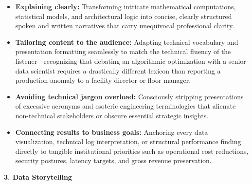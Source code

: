 \begin{itemize}
\tightlist
\item
  \textbf{Explaining clearly:} Transforming intricate mathematical
  computations, statistical models, and architectural logic into
  concise, clearly structured spoken and written narratives that carry
  unequivocal professional clarity.
\item
  \textbf{Tailoring content to the audience:} Adapting technical
  vocabulary and presentation formatting seamlessly to match the
  technical fluency of the listener---recognizing that debating an
  algorithmic optimization with a senior data scientist requires a
  drastically different lexicon than reporting a production anomaly to a
  facility director or floor manager.
\item
  \textbf{Avoiding technical jargon overload:} Consciously stripping
  presentations of excessive acronyms and esoteric engineering
  terminologies that alienate non-technical stakeholders or obscure
  essential strategic insights.
\item
  \textbf{Connecting results to business goals:} Anchoring every data
  visualization, technical log interpretation, or structural performance
  finding directly to tangible institutional priorities such as
  operational cost reductions, security postures, latency targets, and
  gross revenue preservation.
\end{itemize}

\vspace{0.5em}\noindent\textbf{3. Data Storytelling}\par

